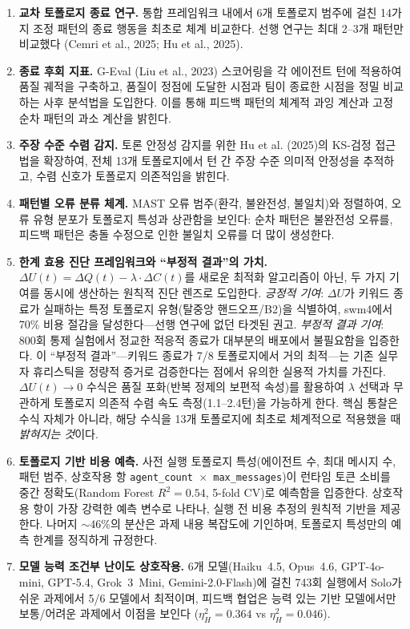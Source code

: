 \documentclass[a4paper,11pt]{article}
\begin{document}
\begin{enumerate}
    \item \textbf{교차 토폴로지 종료 연구.} 통합 프레임워크 내에서 6개 토폴로지 범주에 걸친 14가지 조정 패턴의 종료 행동을 최초로 체계 비교한다. 선행 연구는 최대 2--3개 패턴만 비교했다 (Cemri et al., 2025; Hu et al., 2025).

    \item \textbf{종료 후회 지표.} G-Eval (Liu et al., 2023) 스코어링을 각 에이전트 턴에 적용하여 품질 궤적을 구축하고, 품질이 정점에 도달한 시점과 팀이 종료한 시점을 정밀 비교하는 사후 분석법을 도입한다. 이를 통해 피드백 패턴의 체계적 과잉 계산과 고정 순차 패턴의 과소 계산을 밝힌다.

    \item \textbf{주장 수준 수렴 감지.} 토론 안정성 감지를 위한 Hu et al. (2025)의 KS-검정 접근법을 확장하여, 전체 13개 토폴로지에서 턴 간 주장 수준 의미적 안정성을 추적하고, 수렴 신호가 토폴로지 의존적임을 밝힌다.

    \item \textbf{패턴별 오류 분류 체계.} MAST 오류 범주(환각, 불완전성, 불일치)와 정렬하여, 오류 유형 분포가 토폴로지 특성과 상관함을 보인다: 순차 패턴은 불완전성 오류를, 피드백 패턴은 충돌 수정으로 인한 불일치 오류를 더 많이 생성한다.

    \item \textbf{한계 효용 진단 프레임워크와 ``부정적 결과''의 가치.} $\Delta U(t) = \Delta Q(t) - \lambda \cdot \Delta C(t)$를 새로운 최적화 알고리즘이 아닌, 두 가지 기여를 동시에 생산하는 원칙적 진단 렌즈로 도입한다. \emph{긍정적 기여}: $\Delta U$가 키워드 종료가 실패하는 특정 토폴로지 유형(탈중앙 핸드오프/B2)을 식별하여, swm4에서 70\% 비용 절감을 달성한다---선행 연구에 없던 타겟된 권고. \emph{부정적 결과 기여}: 800회 통제 실험에서 정교한 적응적 종료가 대부분의 배포에서 불필요함을 입증한다. 이 ``부정적 결과''---키워드 종료가 7/8 토폴로지에서 거의 최적---는 기존 실무자 휴리스틱을 정량적 증거로 검증한다는 점에서 유의한 실용적 가치를 가진다. $\Delta U(t) \to 0$ 수식은 품질 포화(반복 정제의 보편적 속성)를 활용하여 $\lambda$ 선택과 무관하게 토폴로지 의존적 수렴 속도 측정(1.1--2.4턴)을 가능하게 한다. 핵심 통찰은 수식 자체가 아니라, 해당 수식을 13개 토폴로지에 최초로 체계적으로 적용했을 때 \emph{밝혀지는 것}이다.

    \item \textbf{토폴로지 기반 비용 예측.} 사전 실행 토폴로지 특성(에이전트 수, 최대 메시지 수, 패턴 범주, 상호작용 항 \texttt{agent\_count $\times$ max\_messages})이 런타임 토큰 소비를 중간 정확도(Random Forest $R^2=0.54$, 5-fold CV)로 예측함을 입증한다. 상호작용 항이 가장 강력한 예측 변수로 나타나, 실행 전 비용 추정의 원칙적 기반을 제공한다. 나머지 ${\sim}46\%$의 분산은 과제 내용 복잡도에 기인하며, 토폴로지 특성만의 예측 한계를 정직하게 규정한다.

    \item \textbf{모델 능력 조건부 난이도 상호작용.} 6개 모델(Haiku~4.5, Opus~4.6, GPT-4o-mini, GPT-5.4, Grok~3~Mini, Gemini-2.0-Flash)에 걸친 743회 실행에서 Solo가 쉬운 과제에서 5/6 모델에서 최적이며, 피드백 협업은 능력 있는 기반 모델에서만 보통/어려운 과제에서 이점을 보인다 ($\eta^{2}_{H}=0.364$ vs $\eta^{2}_{H}=0.046$).
\end{enumerate}
\end{document}
